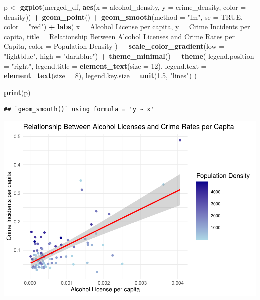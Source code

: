 \documentclass[
  landscape]{article}
\newenvironment{Shaded}{\begin{snugshade}}{\end{snugshade}}
\newcommand{\AttributeTok}[1]{\textcolor[rgb]{0.13,0.29,0.53}{#1}}
\newcommand{\ConstantTok}[1]{\textcolor[rgb]{0.56,0.35,0.01}{#1}}
\newcommand{\DecValTok}[1]{\textcolor[rgb]{0.00,0.00,0.81}{#1}}
\newcommand{\FloatTok}[1]{\textcolor[rgb]{0.00,0.00,0.81}{#1}}
\newcommand{\FunctionTok}[1]{\textcolor[rgb]{0.13,0.29,0.53}{\textbf{#1}}}
\newcommand{\NormalTok}[1]{#1}
\newcommand{\OtherTok}[1]{\textcolor[rgb]{0.56,0.35,0.01}{#1}}
\newcommand{\SpecialCharTok}[1]{\textcolor[rgb]{0.81,0.36,0.00}{\textbf{#1}}}
\newcommand{\StringTok}[1]{\textcolor[rgb]{0.31,0.60,0.02}{#1}}
\begin{document}
\begin{Shaded}
\begin{Highlighting}[]
\NormalTok{p }\OtherTok{\textless{}{-}} \FunctionTok{ggplot}\NormalTok{(merged\_df, }\FunctionTok{aes}\NormalTok{(}\AttributeTok{x =}\NormalTok{ alcohol\_density, }\AttributeTok{y =}\NormalTok{ crime\_density, }\AttributeTok{color =}\NormalTok{ density)) }\SpecialCharTok{+}
  \FunctionTok{geom\_point}\NormalTok{() }\SpecialCharTok{+}
  \FunctionTok{geom\_smooth}\NormalTok{(}\AttributeTok{method =} \StringTok{"lm"}\NormalTok{, }\AttributeTok{se =} \ConstantTok{TRUE}\NormalTok{, }\AttributeTok{color =} \StringTok{"red"}\NormalTok{) }\SpecialCharTok{+} 
  \FunctionTok{labs}\NormalTok{(}
    \AttributeTok{x =} \StringTok{\textquotesingle{}Alcohol License per capita\textquotesingle{}}\NormalTok{,}
    \AttributeTok{y =} \StringTok{\textquotesingle{}Crime Incidents per capita\textquotesingle{}}\NormalTok{,}
    \AttributeTok{title =} \StringTok{\textquotesingle{}Relationship Between Alcohol Licenses and Crime Rates per Capita\textquotesingle{}}\NormalTok{,}
    \AttributeTok{color =} \StringTok{\textquotesingle{}Population Density\textquotesingle{}}
\NormalTok{  ) }\SpecialCharTok{+}
  \FunctionTok{scale\_color\_gradient}\NormalTok{(}\AttributeTok{low =} \StringTok{"lightblue"}\NormalTok{, }\AttributeTok{high =} \StringTok{"darkblue"}\NormalTok{) }\SpecialCharTok{+}
  \FunctionTok{theme\_minimal}\NormalTok{() }\SpecialCharTok{+}
  \FunctionTok{theme}\NormalTok{(}
    \AttributeTok{legend.position =} \StringTok{"right"}\NormalTok{,}
    \AttributeTok{legend.title =} \FunctionTok{element\_text}\NormalTok{(}\AttributeTok{size =} \DecValTok{12}\NormalTok{),}
    \AttributeTok{legend.text =} \FunctionTok{element\_text}\NormalTok{(}\AttributeTok{size =} \DecValTok{8}\NormalTok{),}
    \AttributeTok{legend.key.size =} \FunctionTok{unit}\NormalTok{(}\FloatTok{1.5}\NormalTok{, }\StringTok{"lines"}\NormalTok{)}
\NormalTok{  )}

\FunctionTok{print}\NormalTok{(p)}
\end{Highlighting}
\end{Shaded}

\begin{verbatim}
## `geom_smooth()` using formula = 'y ~ x'
\end{verbatim}

\includegraphics{poli170a_files/figure-latex/unnamed-chunk-4-1.pdf}
\end{document}

